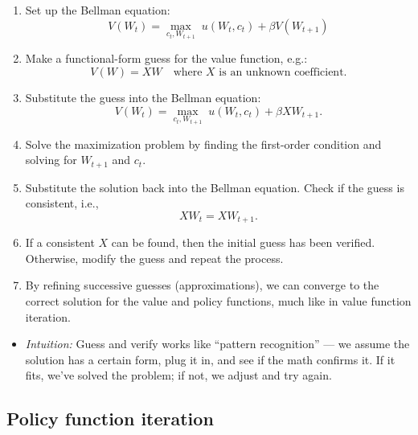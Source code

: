 \documentclass[12pt]{article}
\begin{document}
\begin{enumerate}
    \item Set up the Bellman equation:
    \[
    V(W_t) = \max_{c_t, W_{t+1}} \; u(W_t, c_t) + \beta V(W_{t+1})
    \]

    \item Make a functional-form guess for the value function, e.g.:
    \[
    V(W) = XW \quad \text{where $X$ is an unknown coefficient.}
    \]

    \item Substitute the guess into the Bellman equation:
    \[
    V(W_t) = \max_{c_t, W_{t+1}} \; u(W_t, c_t) + \beta X W_{t+1}.
    \]

    \item Solve the maximization problem by finding the first-order condition and solving for \( W_{t+1} \) and \( c_t \).

    \item Substitute the solution back into the Bellman equation.  
    Check if the guess is consistent, i.e.,
    \[
    X W_t = X W_{t+1}.
    \]

    \item If a consistent \( X \) can be found, then the initial guess has been verified.  
    Otherwise, modify the guess and repeat the process.

    \item By refining successive guesses (approximations), we can converge to the correct solution for the value and policy functions, much like in value function iteration.
\end{enumerate}

\begin{itemize}
    \item \textit{Intuition:} Guess and verify works like “pattern recognition” — we assume the solution has a certain form, plug it in, and see if the math confirms it. If it fits, we’ve solved the problem; if not, we adjust and try again.
\end{itemize}

\subsection*{\noindent\textbf{Policy function iteration}}
\end{document}
